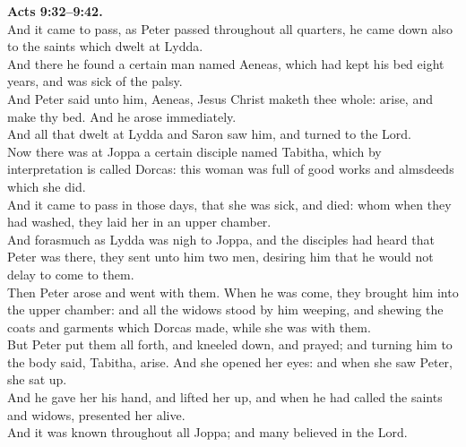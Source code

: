 \documentclass[10pt]{article} %
\begin{document}
{\begin{minipage}[t]{0.45\textwidth}
\textbf{Acts 9:32--9:42.}\\
And it came to pass, as Peter passed throughout all quarters, he came down also to the saints which dwelt at Lydda.\\
And there he found a certain man named Aeneas, which had kept his bed eight years, and was sick of the palsy.\\
And Peter said unto him, Aeneas, Jesus Christ maketh thee whole: arise, and make thy bed. And he arose immediately.\\
And all that dwelt at Lydda and Saron saw him, and turned to the Lord.\\
Now there was at Joppa a certain disciple named Tabitha, which by interpretation is called Dorcas: this woman was full of good works and almsdeeds which she did.\\
And it came to pass in those days, that she was sick, and died: whom when they had washed, they laid her in an upper chamber.\\
And forasmuch as Lydda was nigh to Joppa, and the disciples had heard that Peter was there, they sent unto him two men, desiring him that he would not delay to come to them.\\
Then Peter arose and went with them. When he was come, they brought him into the upper chamber: and all the widows stood by him weeping, and shewing the coats and garments which Dorcas made, while she was with them.\\
But Peter put them all forth, and kneeled down, and prayed; and turning him to the body said, Tabitha, arise. And she opened her eyes: and when she saw Peter, she sat up.\\
And he gave her his hand, and lifted her up, and when he had called the saints and widows, presented her alive.\\
And it was known throughout all Joppa; and many believed in the Lord.\\

\end{minipage}}
\vspace*{\fill}
\newpage
\Huge%
\vspace*{\fill}
\end{document}
